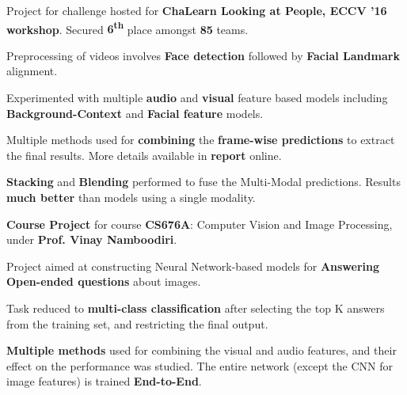 \documentclass[a4paper]{norm-resume}
\begin{document}
	\begin{tightitemize}
	\small
	{
	\item Project for challenge hosted for \textbf{ChaLearn Looking at People, ECCV '16 workshop}. Secured \textbf{6\textsuperscript{th}} place amongst \textbf{85} teams.
	\item Preprocessing of videos involves \textbf{Face detection} followed by \textbf{Facial Landmark} alignment.
	\item Experimented with multiple \textbf{audio} and \textbf{visual} feature based models including \textbf{Background-Context} and \textbf{Facial feature} models.
	\item Multiple methods used for \textbf{combining} the \textbf{frame-wise predictions} to extract the final results. More details available in \textbf{report} online.
	\item \textbf{Stacking} and \textbf{Blending} performed to fuse the Multi-Modal predictions. Results \textbf{much better} than models using a single modality.
	}
	\end{tightitemize}

	\vspace{2mm}

	\descript{Mar '16 - Apr '16}	
	\begin{tightitemize}
	\small
	{
	\item \textbf{Course Project} for course \textbf{CS676A}: Computer Vision and Image Processing, under \textbf{Prof. Vinay Namboodiri}.
	\item Project aimed at constructing Neural Network-based models for \textbf{Answering Open-ended questions} about images.
	\item Task reduced to \textbf{multi-class classification} after selecting the top K answers from the training set, and restricting the final output.
	\item \textbf{Multiple methods} used for combining the visual and audio features, and their effect on the performance was studied. The entire network (except the CNN for image features) is trained \textbf{End-to-End}.
	}
	\end{tightitemize}

	\vspace{2mm}
\end{document}
